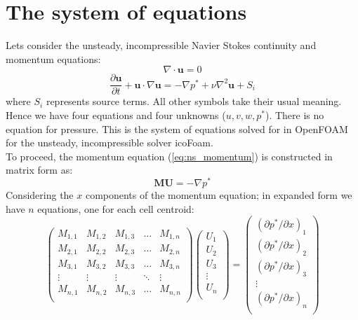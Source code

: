\documentclass[a4paper,11pt]{report}
\begin{document}
\section{The system of equations}
Lets consider the unsteady, incompressible Navier Stokes continuity and momentum equations:
\begin{equation}
    \nabla\cdot\mathbf{u} = 0
    \label{eq:continuity}
\end{equation}
\begin{equation}
    \frac{\partial\mathbf{u}}{\partial{t}} + \mathbf{u}\cdot\nabla\mathbf{u} = -\nabla{p^*} + \nu\nabla^{2}\mathbf{u} + S_i
    \label{eq:ns_momentum}
\end{equation}
where $S_i$ represents source terms. All other symbols take their usual meaning. Hence we have four equations and four unknowns ($u, v, w, p^*$). There is no equation for pressure. This is the system of equations solved for in OpenFOAM for the unsteady, incompressible solver icoFoam.
\vspace{5mm}\\
To proceed, the momentum equation (\ref{eq:ns_momentum}) is constructed in matrix form as:
\begin{equation}
    \mathbf{M}\mathbf{U} = -\nabla{p^*}
    \label{eq:ns_momentum_matrixform}
\end{equation}
Considering the $x$ components of the momentum equation; in expanded form we have $n$ equations, one for each cell centroid:
\begin{equation}
    \begin{pmatrix}
        M_{1,1} & M_{1,2} & M_{1,3} & \dots & M_{1,n}\\
        M_{2,1} & M_{2,2} & M_{2,3} & \dots & M_{2,n}\\
        M_{3,1} & M_{3,2} & M_{3,3} & \dots & M_{3,n}\\
        \vdots  & \vdots  & \vdots  & \ddots & \vdots\\
        M_{n,1} & M_{n,2} & M_{n,3} & \dots & M_{n,n}\\
    \end{pmatrix}
    \begin{pmatrix}
        U_{1}\\
        U_{2}\\
        U_{3}\\
        \vdots\\
        U_{n}\\
    \end{pmatrix} =
    \begin{pmatrix}
        (\partial{p^*}/\partial{x})_1\\
        (\partial{p^*}/\partial{x})_2\\
        (\partial{p^*}/\partial{x})_3\\
        \vdots\\
        (\partial{p^*}/\partial{x})_n\\
    \end{pmatrix}
    \label{eq:ns_momentum_matrixform_ex}
\end{equation}
\end{document}
